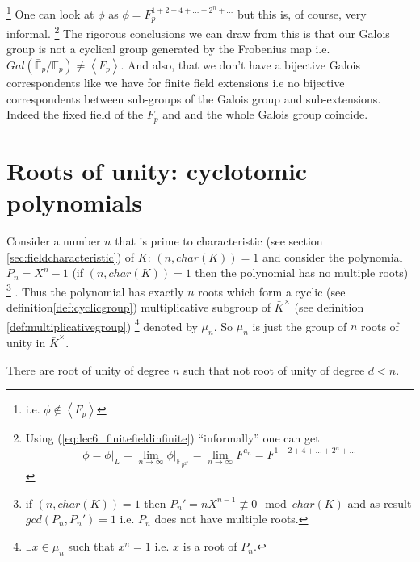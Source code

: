 \footnote{
  i.e. $\phi \notin \left<F_p\right>$
}
One can look at
$\phi$ as $\phi = F_p^{1+2+4+ \dots + 2^n + \dots}$ but this is, of
course, very informal.
\footnote{
  Using (\ref{eq:lec6_finitefieldinfinite}) ``informally'' one can get
  \[
  \phi = \left.\phi\right|_L =
  \lim_{n \to \infty}\left.\phi\right|_{\mathbb{F}_{p^{2^n}}} =
  \lim_{n \to \infty} F^{a_n} = 
  F^{1
    +2 +4 + \dots + 2^n + \dots}
  \]  
}
The rigorous conclusions we can draw from this
is that our Galois group is not a cyclical group generated by the
Frobenius map i.e.
$Gal\left(\bar{\mathbb{F}}_p/\mathbb{F}_p\right) \ne
\left<F_p\right>$. And also, that we don't have a bijective Galois
correspondents like we have for finite field extensions i.e no
bijective correspondents  between sub-groups 
of the Galois group and sub-extensions. Indeed the fixed field of the
$F_p$ and and the whole Galois group coincide.  

\section{ Roots of unity: cyclotomic polynomials}
Consider a number $n$ that is prime to characteristic (see section
\ref{sec:fieldcharacteristic}) of $K$:
$\left(n, char\left(K\right)\right) = 1$ and consider the polynomial
$P_n = X^n - 1$ (if $\left(n, char\left(K\right)\right) = 1$
then the
polynomial has no multiple roots)
\footnote{
 if $\left(n, char\left(K\right)\right) = 1$ then $P_n' = n X^{n-1}
 \not \equiv 0 \mod char\left(K\right)$ and as result
 $gcd\left(P_n, P_n'\right) = 1$ i.e. $P_n$ does not have multiple
 roots. 
}
. Thus the polynomial has exactly $n$
roots which form a cyclic (see definition\ref{def:cyclicgroup})
multiplicative subgroup of $\bar{K}^\times$ 
(see definition \ref{def:multiplicativegroup})
\footnote{
  $\exists x \in \mu_n$ such that $x^n = 1$ i.e. $x$ is a root of $P_n$.
}
denoted by $\mu_n$. So $\mu_n$ is just the group of $n$ roots of unity
in $\bar{K}^\times$.

\begin{definition}
  There are root of unity of degree $n$ such that not root of unity of
  degree $d < n$.
  \label{def:primitiverootsofunity}
\end{definition}

